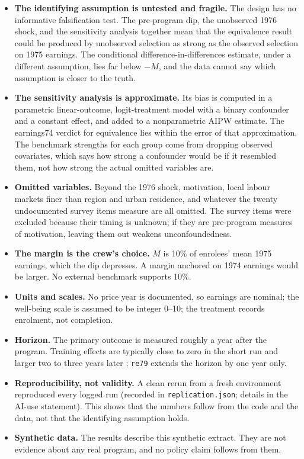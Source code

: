\documentclass[11pt]{article}
\newcommand{\var}[1]{\texttt{#1}}
\begin{document}
\begin{itemize}
\item \textbf{The identifying assumption is untested and fragile.} The design has no
informative falsification test. The pre-program dip, the unobserved 1976 shock, and the
sensitivity analysis together mean that the equivalence result could be produced by
unobserved selection as strong as the observed selection on 1975 earnings. The conditional
difference-in-differences estimate, under a different assumption, lies far below $-M$, and
the data cannot say which assumption is closer to the truth.
\item \textbf{The sensitivity analysis is approximate.} Its bias is computed in a parametric
linear-outcome, logit-treatment model with a binary confounder and a constant effect, and
added to a nonparametric AIPW estimate. The earnings74 verdict for equivalence lies within
the error of that approximation. The benchmark strengths for each group come from dropping
observed covariates, which says how strong a confounder would be if it resembled them, not
how strong the actual omitted variables are.
\item \textbf{Omitted variables.} Beyond the 1976 shock, motivation, local labour markets
finer than region and urban residence, and whatever the twenty undocumented survey items
measure are all omitted. The survey items were excluded because their timing is unknown; if
they are pre-program measures of motivation, leaving them out weakens unconfoundedness.
\item \textbf{The margin is the crew's choice.} $M$ is 10\% of enrolees' mean 1975 earnings,
which the dip depresses. A margin anchored on 1974 earnings would be larger. No external
benchmark supports 10\%.
\item \textbf{Units and scales.} No price year is documented, so earnings are nominal; the
well-being scale is assumed to be integer 0--10; the treatment records enrolment, not
completion.
\item \textbf{Horizon.} The primary outcome is measured roughly a year after the program.
Training effects are typically close to zero in the short run and larger two to three years
later \citep{card2018}; \var{re79} extends the horizon by one year only.
\item \textbf{Reproducibility, not validity.} A clean rerun from a fresh environment
reproduced every logged run (recorded in \texttt{replication.json}; details in the AI-use
statement). This shows that the numbers
follow from the code and the data, not that the identifying assumption holds.
\item \textbf{Synthetic data.} The results describe this synthetic extract. They are not
evidence about any real program, and no policy claim follows from them.
\end{itemize}
\end{document}
